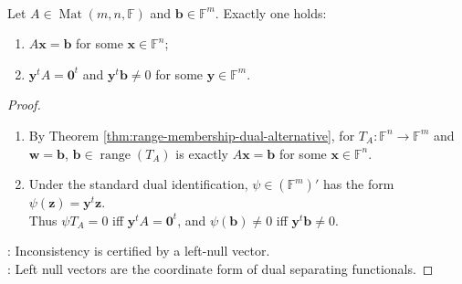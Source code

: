\begin{corollary} \label{cor:matrix-equation-left-nullspace-alternative} \\
Let $A\in\operatorname{Mat}(m,n,\mathbb{F})$ and $\mathbf{b}\in\mathbb{F}^m$. Exactly one holds:
\begin{enumerate}[label=(\roman*)]
\setlength{\itemsep}{0pt}
\item $A\mathbf{x}=\mathbf{b}$ for some $\mathbf{x}\in\mathbb{F}^n$;
\item $\mathbf{y}^tA=\mathbf{0}^t$ and $\mathbf{y}^t\mathbf{b}\neq0$ for some $\mathbf{y}\in\mathbb{F}^m$.
\end{enumerate}
\begin{proof}
\begin{enumerate}[label=(\roman*)]
\setlength{\itemsep}{0pt}
\item By Theorem \ref{thm:range-membership-dual-alternative}, for $T_A:\mathbb{F}^n\to\mathbb{F}^m$ and $\mathbf{w}=\mathbf{b}$, $\mathbf{b}\in\operatorname{range}(T_A)$ is exactly $A\mathbf{x}=\mathbf{b}$ for some $\mathbf{x}\in\mathbb{F}^n$.
\item Under the standard dual identification, $\psi\in(\mathbb{F}^m)'$ has the form $\psi(\mathbf{z})=\mathbf{y}^t\mathbf{z}$.\\
Thus $\psi T_A=0$ iff $\mathbf{y}^tA=\mathbf{0}^t$, and $\psi(\mathbf{b})\neq0$ iff $\mathbf{y}^t\mathbf{b}\neq0$.
\end{enumerate}
: Inconsistency is certified by a left-null vector.\\
: Left null vectors are the coordinate form of dual separating functionals.
\end{proof}
\end{corollary}


